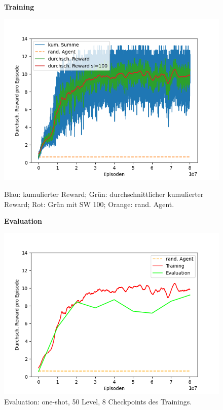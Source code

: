 \begin{figure}[htp!]
   \centering
   \captionsetup{width=0.48\linewidth} 
    \begin{minipage}{0.48\linewidth}
        \textbf{Training}\par\medskip
        \includegraphics[scale=0.49]{abb/_graphen/floor_80Mio_200lvl_15act_Training}
        \caption{Blau: kumulierter Reward; Grün: durchschnittlicher kumulierter Reward; Rot: Grün mit SW 100; Orange: rand. Agent.}
        \label{fig:grph_floor_80Mio_200lvl_15act_Training}
    \end{minipage}
    \centering
    \begin{minipage}{0.48\linewidth}
        \textbf{Evaluation}\par\medskip
        \includegraphics[scale=0.5]{abb/_graphen/floor_80Mio_200lvl_15act_Training_evalAsTraining}
        \caption{Evaluation: one-shot, 50 Level, 8 Checkpoints des Trainings.}
        \label{fig:grph_floor_80Mio_200lvl_15act_evalAsTraining}
        \hfil
    \end{minipage}
\end{figure}

